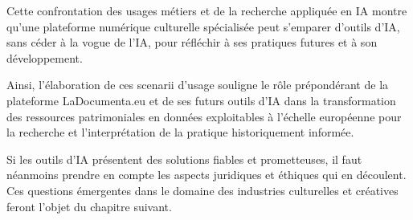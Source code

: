 Cette confrontation des usages métiers et de la recherche appliquée en IA montre qu'une plateforme numérique culturelle spécialisée peut s'emparer d'outils d'IA, sans céder à la vogue de l'IA, pour réfléchir à ses pratiques futures et à son développement.

Ainsi, l'élaboration de ces scenarii d'usage souligne le rôle prépondérant de la plateforme LaDocumenta.eu et de ses futurs outils d'IA dans la transformation des ressources patrimoniales en données exploitables à l'échelle européenne pour la recherche et l'interprétation de la pratique historiquement informée. 

Si les outils d'IA présentent des solutions fiables et prometteuses, il faut néanmoins prendre en compte les aspects juridiques et éthiques qui en découlent. Ces questions émergentes dans le domaine des industries culturelles et créatives feront l'objet du chapitre suivant. 